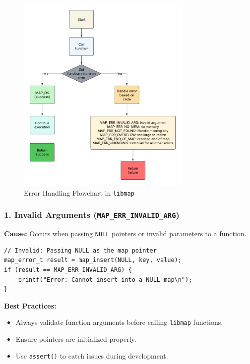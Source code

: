 \documentclass[titlepage]{article}
\begin{document}
\begin{figure}[H]
    \centering
    \includegraphics[width=0.75\textwidth]{hashmap_debugging.pdf}
    \caption{Error Handling Flowchart in \texttt{libmap}}
    \label{fig:debugging_flowchart}
\end{figure}



\subsubsection{1. Invalid Arguments (\texttt{MAP\_ERR\_INVALID\_ARG})}

\textbf{Cause:}
Occurs when passing \texttt{NULL} pointers or invalid parameters to a function.

\begin{verbatim}
// Invalid: Passing NULL as the map pointer
map_error_t result = map_insert(NULL, key, value);
if (result == MAP_ERR_INVALID_ARG) {
    printf("Error: Cannot insert into a NULL map\n");
}
\end{verbatim}

\textbf{Best Practices:}
\begin{itemize}
    \item Always validate function arguments before calling \texttt{libmap} functions.
    \item Ensure pointers are initialized properly.
    \item Use \texttt{assert()} to catch issues during development.
\end{itemize}
\end{document}

